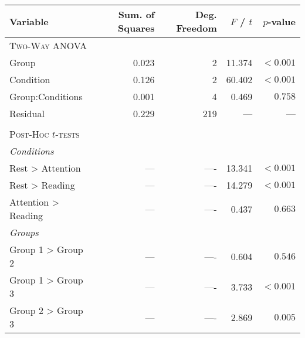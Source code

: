 \begin{tabular}{lrrrr}
\toprule
Variable &    Sum. of Squares &     Deg. Freedom &          $F$ / $t$ &        $p$-value \\
\midrule
\textsc{Two-Way ANOVA} 	& 	& & & \\
Group                   &  0.023 &    2 &  11.374 &  $< 0.001$ \\
Condition               &  0.126 &    2 &  60.402 &  $< 0.001$ \\
Group:Conditions 		&  0.001 &    4 &   0.469 &  $0.758$ \\
Residual                &  0.229 &  219 &        --- &           --- \\
& & & & \\
\textsc{Post-Hoc $t$-tests} & & & & \\
\textit{Conditions} & & & & \\
Rest > Attention  	&  ---  &    ---- &  13.341 &  $< 0.001$ \\
Rest > Reading  	&  ---  &    ---- &  14.279 &  $< 0.001$ \\
Attention > Reading &  ---  &    ---- &  0.437 &  $0.663$ \\
\textit{Groups} & & & & \\
Group 1 > Group 2  &  ---  &    ---- &  0.604 &  $0.546$ \\
Group 1 > Group 3  &  ---  &    ---- &  3.733 &  $< 0.001$ \\
Group 2 > Group 3  &  ---  &    ---- &  2.869 &  $0.005$ \\
\bottomrule
\end{tabular}